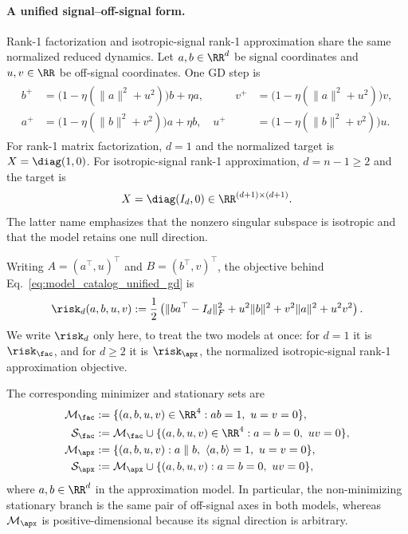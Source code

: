 \documentclass{article}
\begin{document}
\paragraph{A unified signal--off-signal form.}
Rank-1 factorization and isotropic-signal rank-1 approximation share the same
normalized reduced dynamics. Let $a,b\in\RR^d$ be signal coordinates and
$u,v\in\RR$ be off-signal coordinates. One GD step is
\begin{align}
\begin{aligned}
    b^+&=\bigl(1-\eta(\|a\|^2+u^2)\bigr)b+\eta a,
    &\qquad
    v^+&=\bigl(1-\eta(\|a\|^2+u^2)\bigr)v,\\
    a^+&=\bigl(1-\eta(\|b\|^2+v^2)\bigr)a+\eta b,
    &
    u^+&=\bigl(1-\eta(\|b\|^2+v^2)\bigr)u.
\end{aligned}
\label{eq:model_catalog_unified_gd}
\end{align}
For rank-1 matrix factorization, $d=1$ and the normalized target is
$X=\diag(1,0)$. For isotropic-signal rank-1 approximation,
$d=n-1\ge2$ and the target is
\begin{align}
    X=\diag(I_d,0)\in\RR^{(d+1)\times(d+1)}.
\end{align}
The latter name emphasizes that the nonzero singular subspace is isotropic and
that the model retains one null direction.

Writing $A=(a^\top,u)^\top$ and $B=(b^\top,v)^\top$, the objective behind
Eq.~\eqref{eq:model_catalog_unified_gd} is
\begin{align}
    \risk_d(a,b,u,v)
    :=\frac12\left(
        \|ba^\top-I_d\|_F^2
        +u^2\|b\|^2+v^2\|a\|^2+u^2v^2
    \right).
    \label{eq:model_catalog_unified_loss}
\end{align}
We write $\risk_d$ only here, to treat the two models at once: for $d=1$ it is
$\risk_\fac$, and for $d\ge2$ it is $\risk_\apx$, the normalized
isotropic-signal rank-1 approximation objective.

The corresponding minimizer and stationary sets are
\begin{align}
    \mathcal M_\fac
    &:=\{(a,b,u,v)\in\RR^4:ab=1,\ u=v=0\},\\
    \mathcal S_\fac
    &:=\mathcal M_\fac
      \cup\{(a,b,u,v)\in\RR^4:a=b=0,\ uv=0\},
    \label{eq:model_catalog_fac_sets}\\
    \mathcal M_\apx
    &:=\{(a,b,u,v):a\parallel b,\ \langle a,b\rangle=1,\ u=v=0\},\\
    \mathcal S_\apx
    &:=\mathcal M_\apx
      \cup\{(a,b,u,v):a=b=0,\ uv=0\},
    \label{eq:model_catalog_apx_sets}
\end{align}
where $a,b\in\RR^d$ in the approximation model. In particular, the
non-minimizing stationary branch is the same pair of off-signal axes in both
models, whereas $\mathcal M_\apx$ is positive-dimensional because its signal
direction is arbitrary.
\end{document}
